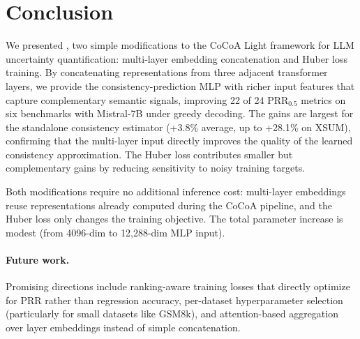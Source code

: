 \section{Conclusion}
\label{sec:conclusion}

We presented \method{}, two simple modifications to the CoCoA Light framework for LLM uncertainty quantification: multi-layer embedding concatenation and Huber loss training.
By concatenating representations from three adjacent transformer layers, we provide the consistency-prediction MLP with richer input features that capture complementary semantic signals, improving 22 of 24 PRR$_{0.5}$ metrics on six benchmarks with Mistral-7B under greedy decoding.
The gains are largest for the standalone consistency estimator (+3.8\% average, up to +28.1\% on XSUM), confirming that the multi-layer input directly improves the quality of the learned consistency approximation.
The Huber loss contributes smaller but complementary gains by reducing sensitivity to noisy training targets.

Both modifications require no additional inference cost: multi-layer embeddings reuse representations already computed during the CoCoA pipeline, and the Huber loss only changes the training objective.
The total parameter increase is modest (from 4096-dim to 12{,}288-dim MLP input).

\paragraph{Future work.}
Promising directions include ranking-aware training losses that directly optimize for PRR rather than regression accuracy, per-dataset hyperparameter selection (particularly for small datasets like GSM8k), and attention-based aggregation over layer embeddings instead of simple concatenation.
